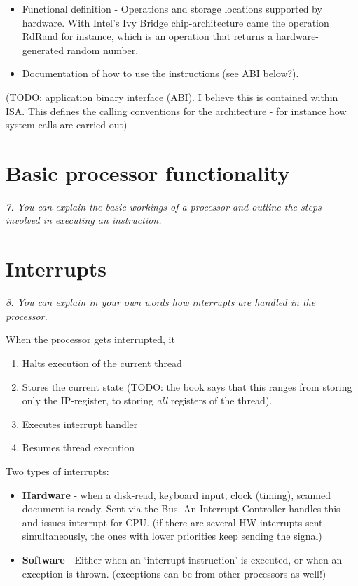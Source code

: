 \documentclass{article}
\begin{document}
\begin{itemize}
	\item Functional definition - Operations and storage locations supported by hardware. With Intel's Ivy Bridge chip-architecture came the operation RdRand for instance, which is an operation that returns a hardware-generated random number.
	\item Documentation of how to use the instructions (see ABI below?).
\end{itemize}

(TODO: application binary interface (ABI). I believe this is contained within ISA. This defines the calling conventions for the architecture - for instance how system calls are carried out)


\section{Basic processor functionality}
\emph{7. You can explain the basic workings of a processor and outline the steps involved in executing an instruction.}



\section{Interrupts}
\emph{8. You can explain in your own words how interrupts are handled in the processor.}

When the processor gets interrupted, it
\begin{enumerate}
	\item Halts execution of the current thread
	\item Stores the current state (TODO: the book says that this ranges from storing only the IP-register, to storing \emph{all} registers of the thread).
	\item Executes interrupt handler
	\item Resumes thread execution
\end{enumerate}

Two types of interrupts:
\begin{itemize}
	\item \textbf{Hardware} - when a disk-read, keyboard input, clock (timing), scanned document is ready. Sent via the Bus.
	An Interrupt Controller handles this and issues interrupt for CPU.
	(if there are several HW-interrupts sent simultaneously, the ones with lower priorities keep sending the signal)

	\item \textbf{Software} - Either when an `interrupt instruction' is executed, or when an exception is thrown. (exceptions can be from other processors as well!)

\end{itemize}
\end{document}
